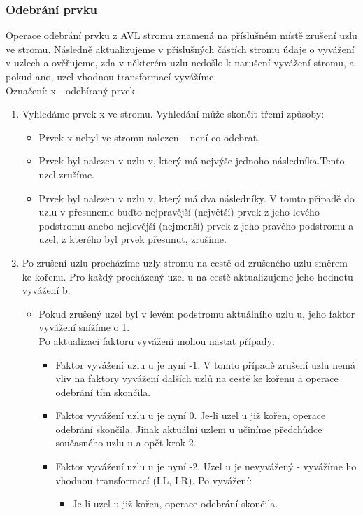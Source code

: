 \documentclass[10pt,a4paper]{article}
\begin{document}
\subsubsection{Odebrání prvku}
Operace odebrání prvku z AVL stromu znamená na příslušném místě zrušení uzlu ve stromu. Následně aktualizujeme v příslušných částích stromu údaje o vyvážení v uzlech a ověřujeme, zda v některém uzlu nedošlo k narušení vyvážení stromu, a pokud ano, uzel vhodnou transformací vyvážíme. \\
Označení: x - odebíraný prvek
\begin{enumerate}
	\item Vyhledáme prvek x ve stromu. Vyhledání může skončit třemi způsoby:
	\begin{itemize}
		\item Prvek x nebyl ve stromu nalezen – není co odebrat.
		\item Prvek byl nalezen v uzlu v, který má nejvýše jednoho následníka.Tento uzel zrušíme.
		\item Prvek byl nalezen v uzlu v, který má dva následníky. V tomto případě do uzlu v přesuneme buďto nejpravější (největší) prvek z jeho levého podstromu anebo nejlevější (nejmenší) prvek z jeho pravého podstromu a uzel, z kterého byl prvek přesunut, zrušíme.
	\end{itemize}
	\item Po zrušení uzlu procházíme uzly stromu na cestě od zrušeného uzlu směrem ke kořenu. Pro každý procházený uzel u na cestě aktualizujeme jeho hodnotu vyvážení b.
	\begin{itemize}
		\item Pokud zrušený uzel byl v levém podstromu aktuálního uzlu u, jeho faktor vyvážení snížíme o 1. \\
		Po aktualizaci faktoru vyvážení mohou nastat případy:
		\begin{itemize}
			\item Faktor vyvážení uzlu u je nyní -1. V tomto případě zrušení uzlu nemá vliv na faktory vyvážení dalších uzlů na cestě ke kořenu a operace odebrání tím skončila.
			\item Faktor vyvážení uzlu u je nyní 0. Je-li uzel u již kořen, operace odebrání skončila. Jinak aktuální uzlem u učiníme předchůdce současného uzlu u a opět krok 2.
			\item Faktor vyvážení uzlu u je nyní -2. Uzel u je nevyvážený - vyvážíme ho vhodnou transformací (LL, LR). Po vyvážení:
			\begin{itemize}
				\item Je-li uzel u již kořen, operace odebrání skončila.

\end{itemize}
\end{itemize}
\end{itemize}
\end{enumerate}
\end{document}
